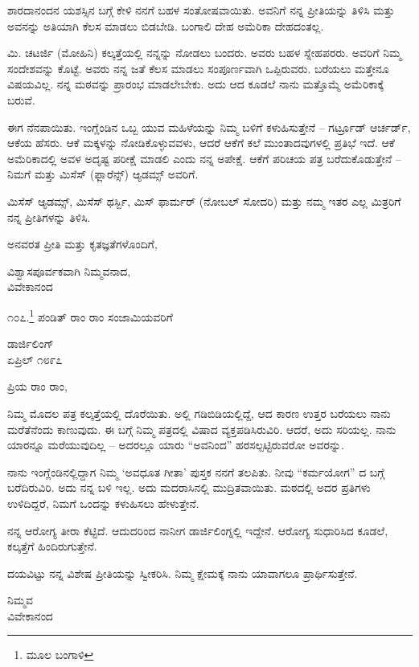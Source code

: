 ಶಾರದಾನಂದನ ಯಶಸ್ಸಿನ ಬಗ್ಗೆ ಕೇಳಿ ನನಗೆ ಬಹಳ ಸಂತೋಷವಾಯಿತು. ಅವನಿಗೆ ನನ್ನ ಪ್ರೀತಿಯನ್ನು ತಿಳಿಸಿ ಮತ್ತು ಅವನನ್ನು ಅತಿಯಾಗಿ ಕೆಲಸ ಮಾಡಲು ಬಿಡಬೇಡಿ. ಬಂಗಾಲಿ ದೇಹ ಅಮೆರಿಕಾ ದೇಹದಂತಲ್ಲ.

ಮಿ. ಚಟರ್ಜಿ (ಮೋಹಿನಿ) ಕಲ್ಕತ್ತೆಯಲ್ಲಿ ನನ್ನನ್ನು ನೋಡಲು ಬಂದರು. ಅವರು ಬಹಳ ಸ್ನೇಹಪರರು. ಅವರಿಗೆ ನಿಮ್ಮ ಸಂದೇಶವನ್ನು ಕೊಟ್ಟೆ. ಅವರು ನನ್ನ ಜತೆ ಕೆಲಸ ಮಾಡಲು ಸಂಪೂರ್ಣವಾಗಿ ಒಪ್ಪಿರುವರು. ಬರೆಯಲು ಮತ್ತೇನೂ ವಿಷಯವಿಲ್ಲ. ನನ್ನ ಮಠವನ್ನು ಪ್ರಾರಂಭ ಮಾಡಲೇಬೇಕು. ಅದು ಆದ ಕೂಡಲೆ ನಾನು ಮತ್ತೊಮ್ಮೆ ಅಮೆರಿಕಾಕ್ಕೆ ಬರುವೆ.

ಈಗ ನೆನಪಾಯಿತು. ಇಂಗ್ಲೆಂಡಿನ ಒಬ್ಬ ಯುವ ಮಹಿಳೆಯನ್ನು ನಿಮ್ಮ ಬಳಿಗೆ ಕಳುಹಿಸುತ್ತೇನೆ – ಗರ್ಟ್ರೂಡ್ ಆರ್ಚರ್ಡ್, ಆಕೆಯ ಹೆಸರು. ಆಕೆ ಮಕ್ಕಳನ್ನು ನೋಡಿಕೊಳ್ಳುವವಳು, ಆದರೆ ಆಕೆಗೆ ಕಲೆ ಮುಂತಾದವುಗಳಲ್ಲಿ ಪ್ರತಿಭೆ ಇದೆ. ಆಕೆ ಅಮೆರಿಕಾದಲ್ಲಿ ಅವಳ ಅದೃಷ್ಟ ಪರೀಕ್ಷೆ ಮಾಡಲಿ ಎಂದು ನನ್ನ ಅಪೇಕ್ಷೆ. ಆಕೆಗೆ ಪರಿಚಯ ಪತ್ರ ಬರೆದುಕೊಡುತ್ತೇನೆ – ನಿಮಗೆ ಮತ್ತು ಮಿಸೆಸ್ (ಫ್ಲಾರೆನ್ಸ್) ಆ್ಯಡಮ್ಸ್ ಅವರಿಗೆ.

ಮಿಸೆಸ್ ಆ್ಯಡಮ್ಸ್, ಮಿಸೆಸ್ ಥರ್ಸ್ಬಿ, ಮಿಸ್ ಫಾರ್ಮರ್ (ನೋಬಲ್ ಸೋದರಿ) ಮತ್ತು ನಮ್ಮ ಇತರ ಎಲ್ಲ ಮಿತ್ರರಿಗೆ ನನ್ನ ಪ್ರೀತಿಗಳನ್ನು ತಿಳಿಸಿ.

ಅನವರತ ಪ್ರೀತಿ ಮತ್ತು ಕೃತಜ್ಞತೆಗಳೊಂದಿಗೆ,

\begin{flushright}
ವಿಶ್ವಾಸಪೂರ್ವಕವಾಗಿ ನಿಮ್ಮವನಾದ,\\ವಿವೇಕಾನಂದ
\end{flushright}

೧೦೭.\footnote{ಮೂಲ ಬಂಗಾಳಿ} ಪಂಡಿತ್ ರಾಂ ರಾಂ ಸಂಜಾಮಿಯವರಿಗೆ

\begin{flushright}
ಡಾರ್ಜಿಲಿಂಗ್\\ಏಪ್ರಿಲ್ ೧೮೯೭
\end{flushright}

ಪ್ರಿಯ ರಾಂ ರಾಂ,

ನಿಮ್ಮ ಮೊದಲ ಪತ್ರ ಕಲ್ಕತ್ತೆಯಲ್ಲಿ ದೊರೆಯಿತು. ಅಲ್ಲಿ ಗಡಿಬಿಡಿಯಲ್ಲಿದ್ದೆ, ಆದ ಕಾರಣ ಉತ್ತರ ಬರೆಯಲು ನಾನು ಮರೆತೆನೆಂದು ಕಾಣುವುದು. ಈ ಬಗ್ಗೆ ನಿಮ್ಮ ಪತ್ರದಲ್ಲಿ ವಿಷಾದ ವ್ಯಕ್ತಪಡಿಸಿರುವಿರಿ. ಆದರೆ, ಅದು ಸರಿಯಲ್ಲ. ನಾನು ಯಾರನ್ನೂ ಮರೆಯುವುದಿಲ್ಲ – ಅದರಲ್ಲೂ ಯಾರು “ಅವನಿಂದ” ಹರಸಲ್ಪಟ್ಟಿರುವರೋ ಅವರನ್ನು.

ನಾನು ಇಂಗ್ಲೆಂಡಿನಲ್ಲಿದ್ದಾಗ ನಿಮ್ಮ ‘ಅವಧೂತ ಗೀತಾ’ ಪುಸ್ತಕ ನನಗೆ ತಲಪಿತು. ನೀವು “ಕರ್ಮಯೋಗ” ದ ಬಗ್ಗೆ ಬರೆದಿರುವಿರಿ. ಅದು ನನ್ನ ಬಳಿ ಇಲ್ಲ. ಅದು ಮದರಾಸಿ‌ನಲ್ಲಿ ಮುದ್ರಿತವಾಯಿತು. ಮಠದಲ್ಲಿ ಅದರ ಪ್ರತಿಗಳು ಉಳಿದಿದ್ದರೆ, ನಿಮಗೆ ಒಂದನ್ನು ಕಳುಹಿಸಲು ಹೇಳುತ್ತೇನೆ.

ನನ್ನ ಆರೋಗ್ಯ ತೀರಾ ಕೆಟ್ಟಿದೆ. ಆದುದರಿಂದ ನಾನೀಗ ಡಾರ್ಜಿಲಿಂಗ್ನಲ್ಲಿ ಇದ್ದೇನೆ. ಆರೋಗ್ಯ ಸುಧಾರಿಸಿದ ಕೂಡಲೆ, ಕಲ್ಕತ್ತೆಗೆ ಹಿಂದಿರುಗುತ್ತೇನೆ.

ದಯವಿಟ್ಟು ನನ್ನ ವಿಶೇಷ ಪ್ರೀತಿಯನ್ನು ಸ್ವೀಕರಿಸಿ. ನಿಮ್ಮ ಕ್ಷೇಮಕ್ಕೆ ನಾನು ಯಾವಾಗಲೂ ಪ್ರಾರ್ಥಿಸುತ್ತೇನೆ.

\begin{flushright}
ನಿಮ್ಮವ\\ವಿವೇಕಾನಂದ
\end{flushright}

